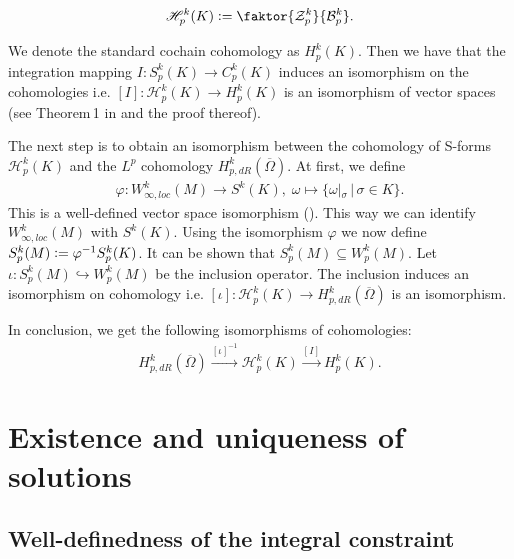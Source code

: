 \documentclass[12pt,a4paper]{article}
\theoremstyle{definition}
\newcommand{\lpcoho}{H^k_{p,dR}}
\newcommand{\omegabar}{\overline{\Omega}}
\begin{document}
\begin{align*}
    \mathscr{H}_p^k(K) \vcentcolon= 
    \faktor{\mathcal{Z}_p^k}{\mathcal{B}_p^k}.
\end{align*}

We denote the standard cochain cohomology as $H^k_p(K)$. Then we have that the 
integration mapping
$I: S_p^k(K) \rightarrow C_p^k(K)$ 
induces an isomorphism on the cohomologies i.e.
$[I]: \mathscr{H}_p^k(K) \rightarrow H^k_p(K)$ is an isomorphism of vector 
spaces (see Theorem\,1 in \cite{goldshtein}
and the proof thereof).







The next step is to obtain an isomorphism between the cohomology 
of S-forms $\mathscr{H}_p^k(K)$ and the $L^p$ cohomology 
$\lpcoho(\omegabar)$. At first, we define 
\begin{align*}
\varphi: W^k_{\infty,loc}(M) \rightarrow S^k(K), \;
\omega \mapsto \{ \omega|_\sigma \, |\, \sigma \in K \}.
\end{align*}
This is a well-defined vector space isomorphism (\cite[p.191]{goldshtein}). This
way we can identify $W^k_{\infty,loc}(M)$ with $S^k(K)$.  Using the
isomorphism $\varphi$ we now define 
$S^k_p(M) \vcentcolon= \varphi^{-1} S^k_p(K)$.
It can be shown that $S^k_p(M) \subseteq W^k_p(M)$. Let 
$\iota: S^k_p(M) \hookrightarrow W^k_p(M)$ be the inclusion operator. 
The inclusion induces an
isomorphism on cohomology \cite[Lemma 4, Corollary]{goldshtein} i.e. 
$[\iota]: \mathscr{H}_p^k(K) \rightarrow \lpcoho(\omegabar)$ is an isomorphism. 


In conclusion, we get the following isomorphisms of cohomologies:
\begin{align*}
    \lpcoho(\omegabar) \xrightarrow{[\iota]^{-1}} \mathscr{H}_p^k(K) 
    \xrightarrow{[I]} H^k_p(K).
\end{align*}







\section{Existence and uniqueness of solutions}
\subsection{Well-definedness of the integral constraint}
\end{document}
